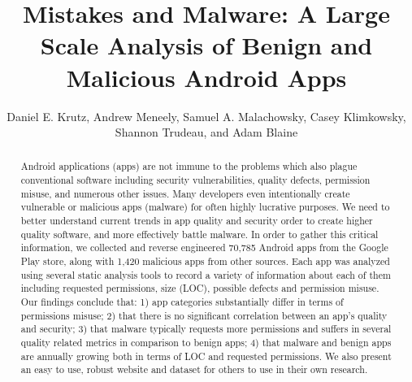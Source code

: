 \documentclass{llncs}
\begin{document}
%
\frontmatter          %
%
\pagestyle{headings}  %
%

\mainmatter              %
%
\title{Mistakes and Malware: A Large Scale Analysis of Benign and Malicious Android Apps}
%
%


\author{Daniel E. Krutz, Andrew Meneely, Samuel A. Malachowsky, Casey Klimkowsky, Shannon Trudeau, and Adam Blaine}

%

\maketitle              %

\begin{abstract}

Android applications (apps) are not immune to the problems which also plague conventional software including security vulnerabilities, quality defects, permission misuse, and numerous other issues. Many developers even intentionally create vulnerable or malicious apps (malware) for often highly lucrative purposes. We need to better understand current trends in app quality and security order to create higher quality software, and more effectively battle malware. In order to gather this critical information, we collected and reverse engineered 70,785 Android apps from the Google Play store, along with 1,420 malicious apps from other sources. Each app was analyzed using several static analysis tools to record a variety of information about each of them including requested permissions, size (LOC), possible defects and permission misuse. Our findings conclude that: 1) app categories substantially differ in terms of permissions misuse; 2) that there is no significant correlation between an app's quality and security; 3) that malware typically requests more permissions and suffers in several quality related metrics in comparison to benign apps; 4) that malware and benign apps are annually growing both in terms of LOC and requested permissions. We also present an easy to use, robust website and dataset for others to use in their own research.


\end{abstract}
%
\end{document}

